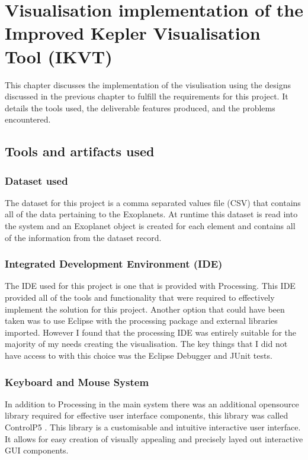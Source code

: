 \chapter{Visualisation implementation of the Improved Kepler Visualisation Tool
(IKVT)}\label{C:sd}
This chapter discusses the implementation of the visulisation using the designs
discussed in the previous chapter to fulfill the requirements for this project.
It details the tools used, the deliverable features
produced, and the problems encountered. 

\section{Tools and artifacts used}
\subsection{Dataset used}
The dataset for this project is a comma separated values file (CSV) that
contains all of the data pertaining to the Exoplanets. At runtime this dataset
is read into the system and an Exoplanet object is created for each element and
contains all of the information from the dataset record.

\subsection{Integrated Development Environment (IDE)}
The IDE used for this project is one that is provided with Processing. This IDE
provided all of the tools and functionality that were required to effectively
implement the solution for this project. Another option that could have been
taken was to use Eclipse with the processing package and external libraries
imported. However I found that the processing IDE was entirely suitable for the
majority of my needs creating the visualisation. The key things that I did not
have access to with this choice was the Eclipse Debugger and JUnit tests. ~   
\subsection{Keyboard and Mouse System}
In addition to Processing in the main system there was an additional opensource
library required for effective user interface components, this library was
called ControlP5 \cite{controlp5}. This library is a customisable and intuitive interactive
user interface. It allows for easy creation of visually appealing and precisely
layed out interactive GUI components.


